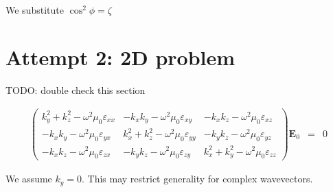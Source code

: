 \documentclass[12pt,a4paper,twoside,openright,BCOR10mm,headsepline,titlepage,abstracton,chapterprefix,final]{scrreprt}
\newcommand\Vector[1]{{\mathbf{#1}}}
\newcommand\vacuum{0}
\newcommand\wavenumber{k}
\newcommand\scalarEfield{E}
\newcommand\Efield{\Vector{\scalarEfield}}
\newcommand\vacuumpermeability{\scalarpermeability_{\vacuum}}
\newcommand\scalarpermeability{\mu}
\newcommand\scalarpermittivity{\varepsilon}
\begin{document}
We substitute $\cos^2 \phi = \zeta$





\section{Attempt 2: 2D problem}
TODO: double check this section

\begin{eqnarray}
\begin{pmatrix}
 \wavenumber_y^2 + \wavenumber_z^2 - \omega^2 \vacuumpermeability \scalarpermittivity_{xx} 
 &
 - \wavenumber_x \wavenumber_y - \omega^2 \vacuumpermeability \scalarpermittivity_{xy}
 &
 - \wavenumber_x \wavenumber_z - \omega^2 \vacuumpermeability \scalarpermittivity_{xz}
 \\
 - \wavenumber_x \wavenumber_y - \omega^2 \vacuumpermeability \scalarpermittivity_{yx}
 &
 \wavenumber_x^2 + \wavenumber_z^2 - \omega^2 \vacuumpermeability \scalarpermittivity_{yy} 
 &
 - \wavenumber_y \wavenumber_z - \omega^2 \vacuumpermeability \scalarpermittivity_{yz}
 \\
 - \wavenumber_x \wavenumber_z - \omega^2 \vacuumpermeability \scalarpermittivity_{zx}
 &
 - \wavenumber_y \wavenumber_z - \omega^2 \vacuumpermeability \scalarpermittivity_{zy}
 &
 \wavenumber_x^2 + \wavenumber_y^2 - \omega^2 \vacuumpermeability \scalarpermittivity_{zz}  
\end{pmatrix}
\Efield_0
&=& 0 \label{eq:generalDispersionEigenEquation}
\end{eqnarray}

We assume $\wavenumber_y =0$.
This may restrict generality for complex wavevectors.
\end{document}
